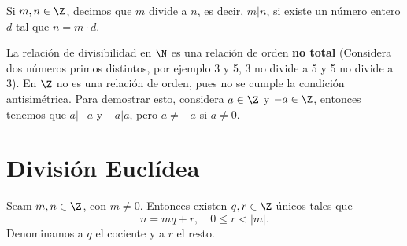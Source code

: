 \begin{fdefinition}
\normalfont Si $\displaystyle m, n \in \Z $, decimos que $\displaystyle m $ divide a $\displaystyle n $, es decir, $\displaystyle  m|n $, si existe un número entero $\displaystyle d $ tal que $\displaystyle n = m\cdot d $. 
\end{fdefinition}

La relación de divisibilidad en $\displaystyle \N $ es una relación de orden \textbf{no total} (Considera dos números primos distintos, por ejemplo 3 y 5, 3 no divide a 5 y 5 no divide a 3). En $\displaystyle  \Z $ no es una relación de orden, pues no se cumple la condición antisimétrica. Para demostrar esto, considera $\displaystyle a\in \Z $ y $\displaystyle -a \in \Z $, entonces tenemos que $\displaystyle a|-a $ y $\displaystyle -a|a $, pero $\displaystyle a \neq -a $ si $\displaystyle a\neq 0 $. 

\section{División Euclídea}

\begin{ftheorem}
\normalfont Seam $\displaystyle  m,n \in \Z $, con $\displaystyle m \neq0 $. Entonces existen $\displaystyle  q, r \in \Z $ únicos tales que 
\[n = mq + r, \quad 0 \leq r < \left|m\right| .\]
Denominamos a $\displaystyle q $ el cociente y a $\displaystyle r $ el resto.
\end{ftheorem}

